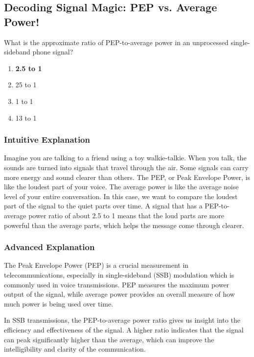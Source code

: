 \subsection{Decoding Signal Magic: PEP vs. Average Power!}

\begin{tcolorbox}[colback=yellow!10!white,colframe=yellow!80!black,title=\textbf{Question ID: E8A06}]
What is the approximate ratio of PEP-to-average power in an unprocessed single-sideband phone signal? 
\begin{enumerate}[label=\Alph*.]
    \item \textbf{2.5 to 1}
    \item 25 to 1
    \item 1 to 1
    \item 13 to 1
\end{enumerate}
\end{tcolorbox}

\subsubsection{Intuitive Explanation}
Imagine you are talking to a friend using a toy walkie-talkie. When you talk, the sounds are turned into signals that travel through the air. Some signals can carry more energy and sound clearer than others. The PEP, or Peak Envelope Power, is like the loudest part of your voice. The average power is like the average noise level of your entire conversation. In this case, we want to compare the loudest part of the signal to the quiet parts over time. A signal that has a PEP-to-average power ratio of about 2.5 to 1 means that the loud parts are more powerful than the average parts, which helps the message come through clearer.

\subsubsection{Advanced Explanation}
The Peak Envelope Power (PEP) is a crucial measurement in telecommunications, especially in single-sideband (SSB) modulation which is commonly used in voice transmissions. PEP measures the maximum power output of the signal, while average power provides an overall measure of how much power is being used over time.

In SSB transmissions, the PEP-to-average power ratio gives us insight into the efficiency and effectiveness of the signal. A higher ratio indicates that the signal can peak significantly higher than the average, which can improve the intelligibility and clarity of the communication.

